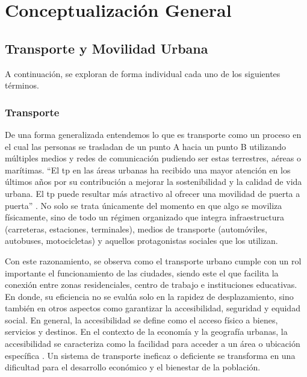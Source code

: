 \chapter[Conceptualización General]{Conceptualización General}
\label{cp:concep-general}

\insertminitoc
\parindent0pt


\section{Transporte y Movilidad Urbana}
A continuación, se exploran de forma individual cada uno de los siguientes términos.

\subsection{Transporte}
De una forma generalizada entendemos lo que es 
transporte como un proceso en el cual las 
personas se trasladan de un punto A hacia 
un punto B utilizando múltiples medios y 
redes de comunicación pudiendo ser estas 
terrestres, aéreas o marítimas. ``El \acrfull{tp} en las áreas 
urbanas ha recibido una mayor atención en 
los últimos años por su contribución a mejorar 
la sostenibilidad y la calidad de vida urbana.
El \acrshort{tp} puede resultar más atractivo al 
ofrecer una movilidad de puerta a puerta'' \cite{saif_public_2019}.
No solo se trata únicamente del momento en que algo se moviliza 
físicamente, sino de todo un régimen organizado que integra 
infraestructura (carreteras, estaciones, terminales), 
medios de transporte (automóviles, autobuses, motocicletas) y aquellos 
protagonistas sociales que los utilizan.

Con este razonamiento, se observa como el transporte urbano 
cumple con un rol importante el funcionamiento de las ciudades, 
siendo este el que facilita la conexión entre zonas residenciales, 
centro de trabajo e instituciones educativas. En donde, su eficiencia no 
se evalúa solo en la rapidez de desplazamiento, sino también en otros 
aspectos como garantizar la accesibilidad, seguridad y equidad social. 
En general, la accesibilidad se define como el acceso físico a bienes, 
servicios y destinos. En el contexto de la economía y la geografía 
urbanas, la accesibilidad se caracteriza como la facilidad para 
acceder a un área o ubicación específica \cite{saif_public_2019}.
Un sistema de transporte ineficaz o deficiente se transforma en una 
dificultad para el desarrollo económico y el bienestar de la población.

